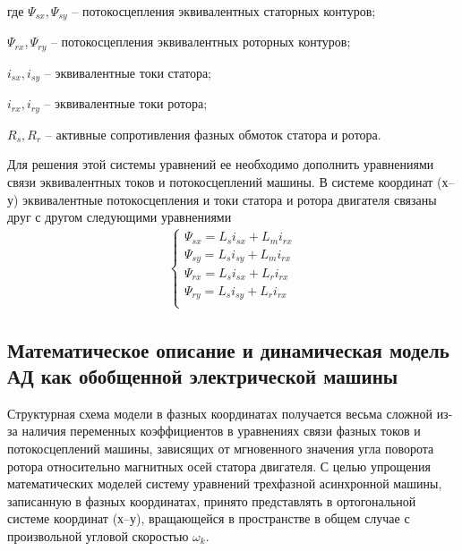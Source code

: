         где $\Psi_{sx}, \Psi_{sy}$ -- потокосцепления эквивалентных статорных
            контуров;\par
        $\Psi_{rx}, \Psi_{ry}$ -- потокосцепления эквивалентных роторных
            контуров;\par
        $i_{sx}, i_{sy}$ -- эквивалентные  токи статора;\par
        $i_{rx}, i_{ry}$ -- эквивалентные  токи ротора;\par
        $R_s, R_r$ -- активные сопротивления фазных обмоток статора и ротора.

        Для решения этой системы уравнений ее необходимо дополнить уравнениями
        связи эквивалентных токов и потокосцеплений машины. В системе координат
        (х–у) эквивалентные потокосцепления и токи статора и ротора двигателя
        связаны друг с другом следующими уравнениями
        \begin{gather*}
            \left\{
            \begin{aligned}
                \Psi_{sx} = L_s i_{sx} + L_m i_{rx}\\
                \Psi_{sy} = L_s i_{sy} + L_m i_{rx}\\
                \Psi_{rx} = L_s i_{sx} + L_r i_{rx}\\
                \Psi_{ry} = L_s i_{sy} + L_r i_{rx}\\
            \end{aligned}
            \right.
        \end{gather*}

    \subsection{Математическое описание и динамическая модель АД как обобщенной
        электрической машины}

        Структурная схема модели в фазных координатах получается весьма сложной
        из-за наличия переменных коэффициентов в уравнениях связи фазных токов
        и потокосцеплений машины, зависящих от мгновенного значения угла
        поворота ротора относительно магнитных осей статора двигателя. С целью
        упрощения математических моделей систему уравнений трехфазной
        асинхронной машины, записанную в фазных координатах, принято
        представлять в ортогональной системе координат (х–у), вращающейся в
        пространстве в общем случае с произвольной угловой скоростью $\omega_k$.

